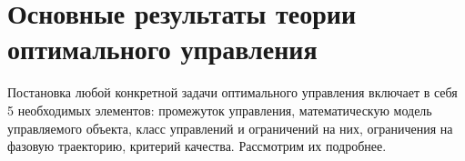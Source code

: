 
\section{Основные результаты теории оптимального управления}\label{1sec:optimal-control}

Постановка любой конкретной задачи оптимального управления включает в себя 5 необходимых элементов: промежуток управления, математическую модель управляемого объекта, класс управлений и ограничений на них, ограничения на фазовую траекторию,
критерий качества.
Рассмотрим их подробнее.

